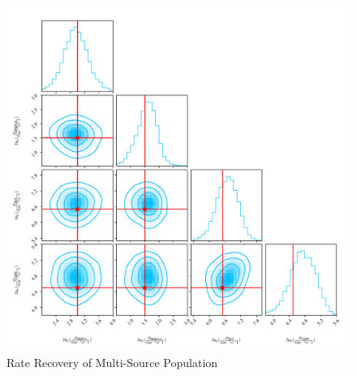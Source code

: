 \documentclass[a0,portrait]{a0poster}
\begin{document}
\begin{multicols}{3}
\begin{frame}
\begin{figure}[H]
    \centering
    \includegraphics[width=0.7\linewidth]{assets/plots/multi_source_rate.pdf}
    \caption{Rate Recovery of Multi-Source Population}
    \label{fig:multi-source rate recovery}
\end{figure}

\end{frame}

\end{multicols}





\end{document}
